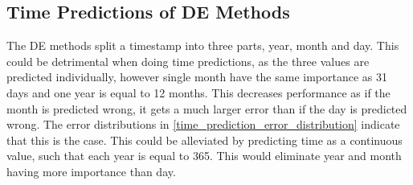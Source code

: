 \subsection{Time Predictions of DE Methods}

The DE methods split a timestamp into three parts, year, month and day. This could be detrimental when doing time predictions, as the three values are predicted individually, however single month have the same importance as 31 days and one year is equal to 12 months. This decreases performance as if the month is predicted wrong, it gets a much larger error than if the day is predicted wrong.
The error distributions in \autoref{time_prediction_error_distribution} indicate that this is the case.
This could be alleviated by predicting time as a continuous value, such that each year is equal to 365. This would eliminate year and month having more importance than day. 